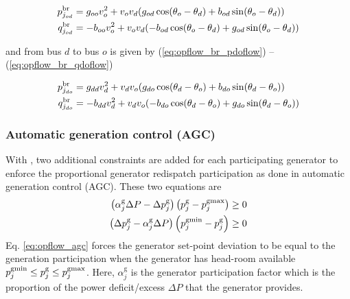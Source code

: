 \begin{align}
p^\text{br}_{j_{od}} &= g_{oo}{v^2_o} + v_ov_d(g_{od}\cos(\theta_o - \theta_d) + b_{od}\sin(\theta_o - \theta_d)) \label{eq:opflow_br_podflow}\\
q^\text{br}_{j_{od}} &= -b_{oo}{v^2_o} + v_ov_d(-b_{od}\cos(\theta_o - \theta_d) + g_{od}\sin(\theta_o - \theta_d)) \label{eq:opflow_br_qodflow}
\end{align}

\noindent
and from bus $d$ to bus $o$ is given by (\ref{eq:opflow_br_pdoflow}) -- (\ref{eq:opflow_br_qdoflow})

\begin{align}
p^\text{br}_{j_{do}} &= g_{dd}{v^2_d} + v_dv_o(g_{do}\cos(\theta_d - \theta_o) + b_{do}\sin(\theta_d - \theta_o))  \label{eq:opflow_br_pdoflow} \\
q^\text{br}_{j_{do}} &= -b_{dd}{v^2_d} + v_dv_o(-b_{do}\cos(\theta_d - \theta_o) + g_{do}\sin(\theta_d - \theta_o)) \label{eq:opflow_br_qdoflow}
\end{align}

\subsubsection{Automatic generation control (AGC)}
With \option{\opflowuseagc}, two additional constraints are added for each participating generator to enforce the proportional generator redispatch participation as done in automatic generation control (AGC). These two equations are 
\begin{equation}
\begin{aligned}
  \left(\alpha^{\text{g}}_j\Delta{P} - \Delta{p}^\text{g}_j\right)\left(p^\text{g}_j - p^\text{gmax}_j\right) \ge 0 \\
  \left(\Delta{p}^\text{g}_j - \alpha^{\text{g}}_j\Delta{P}\right)\left(p^\text{gmin}_j - p^\text{g}_j\right) \ge 0
\end{aligned}
\label{eq:opflow_agc}
\end{equation}
Eq. \ref{eq:opflow_agc} forces the generator set-point deviation to be equal to the generation participation when the generator has head-room available $p^\text{gmin}_j \le p^\text{g}_j \le p^\text{gmax}_j$. Here, $\alpha^{\text{g}}_j$ is the generator participation factor which is the proportion of the power deficit/excess $\Delta{P}$ that the generator provides.

